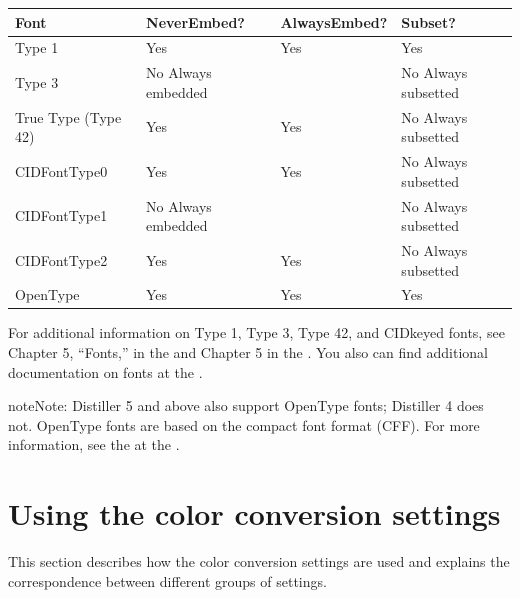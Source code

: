 \documentclass[letterpaper,12pt,english,openany,oneside]{sphinxmanual}
\begin{document}
\begin{savenotes}\sphinxattablestart
\centering
{}\label{\detokenize{PDF_Create_UsingSettings:section-2}}\nobreak
\begin{tabulary}{\linewidth}[t]{|T|T|T|T|}
\hline
\sphinxstyletheadfamily 
Font
&\sphinxstyletheadfamily 
NeverEmbed?
&\sphinxstyletheadfamily 
AlwaysEmbed?
&\sphinxstyletheadfamily 
Subset?
\\
\hline
Type 1
&
Yes
&
Yes
&
Yes
\\
\hline
Type 3
&
No \sphinxhyphen{} Always embedded
&&
No \sphinxhyphen{} Always subsetted
\\
\hline
True Type (Type 42)
&
Yes
&
Yes
&
No \sphinxhyphen{} Always subsetted
\\
\hline
CIDFontType0
&
Yes
&
Yes
&
No \sphinxhyphen{} Always subsetted
\\
\hline
CIDFontType1
&
No \sphinxhyphen{} Always embedded
&&
No \sphinxhyphen{} Always subsetted
\\
\hline
CIDFontType2
&
Yes
&
Yes
&
No \sphinxhyphen{} Always subsetted
\\
\hline
OpenType
&
Yes
&
Yes
&
Yes
\\
\hline
\end{tabulary}
\par
\sphinxattableend\end{savenotes}

For additional information on Type 1, Type 3, Type 42, and CID\sphinxhyphen{}keyed fonts, see Chapter 5, “Fonts,” in the  and Chapter 5 in the  . You also can find additional documentation on fonts at the  .

\begin{sphinxadmonition}{note}{Note:}
Distiller 5 and above also support OpenType fonts; Distiller 4 does not. OpenType fonts are based on the compact font format (CFF). For more information, see the  at the  .
\end{sphinxadmonition}




\section{Using the color conversion settings}
\label{\detokenize{PDF_Create_UsingSettings:using-the-color-conversion-settings}}
This section describes how the color conversion settings are used and explains the correspondence between different groups of settings.
\end{document}
